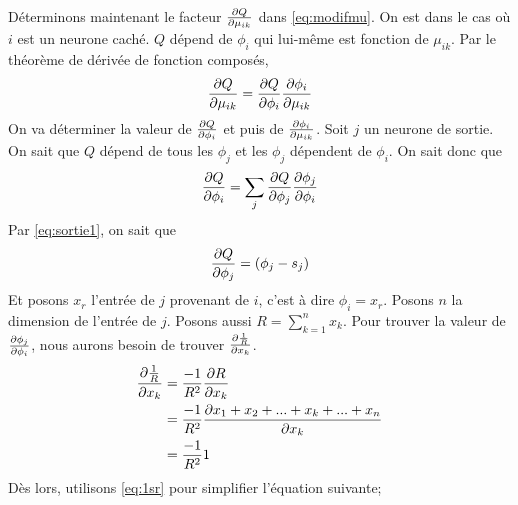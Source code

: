 Déterminons maintenant le facteur $\frac{\partial Q}{\partial \mu_{ik}}$ dans \eqref{eq:modifmu}. On est dans le cas où $i$ est un neurone caché.
$Q$ dépend de $\phi_i$ qui lui-même est fonction de $\mu_{ik}$. Par le théorème de dérivée de fonction composés,
\begin{equation}\label{eq:composemu}
 \frac{\partial Q}{\partial \mu_{ik}} = \frac{\partial Q}{\partial \phi_i} \frac{\partial \phi_i}{\partial \mu_{ik}}
\end{equation}
On va déterminer la valeur de $\frac{\partial Q}{\partial \phi_i}$ et puis de $\frac{\partial \phi_i}{\partial \mu_{ik}}$.
Soit $j$ un neurone de sortie. On sait que $Q$ dépend de tous les $\phi_j$ et les $\phi_j$ dépendent de $\phi_i$. On sait donc que
\begin{equation}\label{eq:mufact1}
 \frac{\partial Q}{\partial \phi_i} = \sum_{j} \frac{\partial Q}{\partial \phi_j}\frac{\partial \phi_j}{\partial \phi_i}
\end{equation}
Par \eqref{eq:sortie1}, on sait que
\[\frac{\partial Q}{\partial \phi_j} = (\phi_j - s_j)\]
Et posons $x_r$ l'entrée de $j$ provenant de $i$, c'est à dire $\phi_i = x_r$.
Posons $n$ la dimension de l'entrée de $j$.
Posons aussi $R = \sum_{k=1}^{n}x_k$.
Pour trouver la valeur de $\frac{\partial \phi_j}{\partial \phi_i}$, nous aurons besoin de trouver $\frac{\partial \frac{1}{R}}{\partial x_k}$.
\begin{equation}\label{eq:1sr}
 \begin{split}
 \frac{\partial \frac{1}{R}}{\partial x_k} & = \frac{-1}{R^2}\frac{\partial R}{\partial x_k}\\
 ~ & = \frac{-1}{R^2}\frac{\partial x_1+x_2+...+x_k+...+x_n}{\partial x_k}\\
 ~ & = \frac{-1}{R^2} 1
 \end{split}
\end{equation}
Dès lors, utilisons \eqref{eq:1sr} pour simplifier l'équation suivante;

